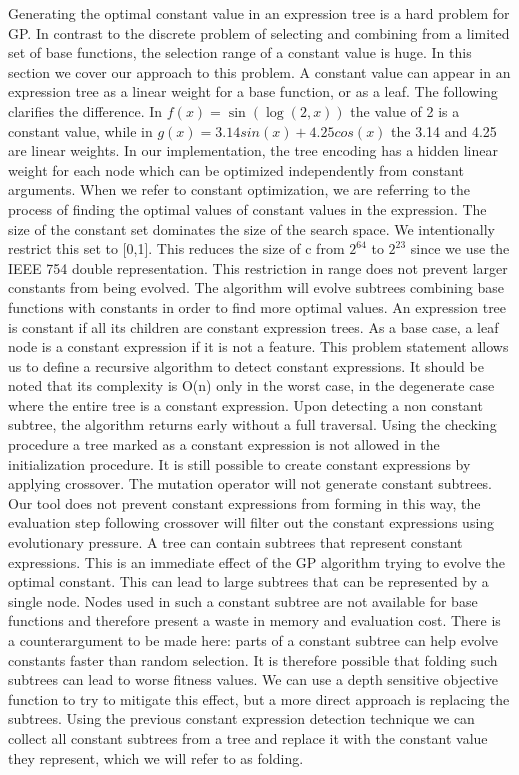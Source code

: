 Generating the optimal constant value in an expression tree is a hard problem for GP. In contrast to the discrete problem of selecting and combining from a limited set of base functions, the selection range of a constant value is huge. In this section we cover our approach to this problem.
A constant value can appear in an expression tree as a linear weight for a base function, or as a leaf. The following clarifies the difference. In $ f(x) = \sin(\log(2, x))$ the value of 2 is a constant value, while in $ g(x) = 3.14 sin(x) + 4.25 cos(x)$ the 3.14 and 4.25 are linear weights. In our implementation, the tree encoding has a hidden linear weight for each node which can be optimized independently from constant arguments. When we refer to constant optimization, we are referring to the process of finding the optimal values of constant values in the expression.
The size of the constant set dominates the size of the search space. We intentionally restrict this set to [0,1]. This reduces the size of c from $2^{64}$ to $2^{23}$ since we use the IEEE 754 double representation. This restriction in range does not prevent larger constants from being evolved. The algorithm will evolve subtrees combining base functions with constants in order to find more optimal values.
An expression tree is constant if all its children are constant expression trees. As a base case, a leaf node is a constant expression if it is not a feature. This problem statement allows us to define a recursive algorithm to detect constant expressions. It should be noted that its complexity is O(n) only in the worst case, in the degenerate case where the entire tree is a constant expression. Upon detecting a non constant subtree, the algorithm returns early without a full traversal. 
Using the checking procedure a tree marked as a constant expression is not allowed in the initialization procedure. It is still possible to create constant expressions by applying crossover. The mutation operator will not generate constant subtrees. Our tool does not prevent constant expressions from forming in this way, the evaluation step following crossover will filter out the constant expressions using evolutionary pressure. A tree can contain subtrees that represent constant expressions. This is an immediate effect of the GP algorithm trying to evolve the optimal constant. This can lead to large subtrees that can be represented by a single node. Nodes used in such a constant subtree are not available for base functions and therefore present a waste in memory and evaluation cost. There is a counterargument to be made here: parts of a constant subtree can help evolve constants faster than random selection. It is therefore possible that folding such subtrees can lead to worse fitness values. We can use a depth sensitive objective function to try to mitigate this effect, but a more direct approach is replacing the subtrees. Using the previous constant expression detection technique we can collect all constant subtrees from a tree and replace it with the constant value they represent, which we will refer to as folding.
